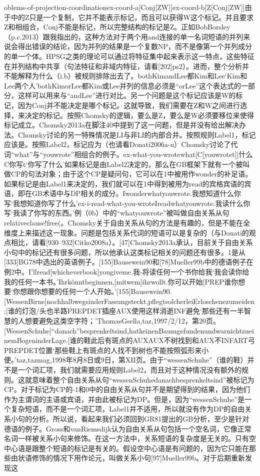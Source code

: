 oblems-of-projection-coordinationex-coord-a[Conj[ZW]]ex-coord-b[Z[Conj[ZW]]由于中的Z只是一个复制，它并不能表示标记，而且可以获得W这个标记。并且要求Z和相组合，Conj不能是标记，所以完整结构的标记是Z。正如BobBorsley（p.c.2013）跟我指出的，这种方法对于两个用and连接的单一名词短语的并列来说会得出错误的结论，因为并列的结果是一个复数NP，而不是像第一个并列成分的单一个体。HPSG之类的理论可以通过将特征集中起来表示这一特点，这些特征在并列结构中共享（句法特征和非域内特征，请看[202]ps2）。进而，整个分析并不能解释为什么（i.b）被规则排除出去了。bothKimandLee都Kim和Lee`Kim和Lee两个人'bothKimorLee都Kim或Lee并列的信息必须是“orLee”这个表达式的一部分，这样可以用来与“andLee”进行对比。另一个问题是这个标记应该是W的标记，因为Conj并不能决定是哪个标记。这就导致，我们需要在Z和W之间进行选择，来决定的标记。按照Chomsky的逻辑，要么是Z，要么是W必须要移位来使得标记成立。Chomsky2013a在脚注40中提到了这一问题，但是并没有给出解决办法。Chomsky讨论的另一特殊情况是LI与非LI的内部合并。按照规则Label1，标记应该是。按照Label2，标记应为（也请看Donati2006a-u）Chomsky讨论了代词“what”与“youwrote”相组合的例子。ex-what-you-wrotewhat[C[youwrotet]]什么C你写t`你写了什么'如果标记是由Label2决定的，那么在GB框架下就有一个被叫做CP的句法对象；由于这个CP是疑问句，它可以在1中被用作wonder的补足语。如果标记是由Label1来决定的，我们就可以在1中得到被用为read的宾格宾语的宾语，即在GB术语中与DP相关的成分。Iwonderwhatyouwrote.我想知道什么你写`我想知道你写了什么'ex-i-read-what-you-wroteIreadwhatyouwrote.我读什么你写`我读了你写的东西。'例（0b）中的“whatyouwrote”被叫做自由关系从句relativeclause!free(。Chomsky关于自由关系从句的方法是有趣的，但是不能在全维度上来描述这一现象。问题是包括关系代词的短语可以是复杂的（与Donati的观点相比，请看[930--932]Citko2008a）。[47]Chomsky2013a承认，目前关于自由关系小句中的标记还有很多问题，所以他承认这类标记相关的问题还有很多。1是从[333]BG78中选出的英语例子。[155]Bausewein90和[78]Mueller99b中的德语例子在例2中。I'llread[whicheverbook]yougiveme.我-将读任何一个书你给我`我会读你给我的任何一本书。'Ihrkönntbeginnen,[mitwem]ihrwollt.你可以开始[PREP谁你想要`你想跟你想要的任何一个人开始。'[155]Bausewein90.[WessenBirne]nochhalbwegsinderFassungsteckt,pflegtsolcherleiErloschenezumeiden;[谁的灯泡/头也半路PREPDET插座AUX使用这样消逝INF避免`那些还有一半智慧的人想要避免这类空字符；'ThomasGsella,taz,1997/2/12，第20页。[WessenSchuhe]"`danach"'besprenkeltsind,hatkeinenBaumgefundenundwarnichtzueinemBogeninderLage.[谁的鞋此后有斑点的AUXAUX不树找到和AUX不INFART弓PREPDET位置`那些鞋上有斑点的人找不到树也不能按照弧形来小便。'taz,tazmag,1998年8月8日或9日，第XII页。由于“wessenSchuhe”（谁的鞋）并不是一个词汇项，我们就需要应用规则Label2，而且对于这种情况没有额外的规则。这就意味着整个自由关系从句“wessenSchuhedanachbesprenkeltsind”被标记为CP。对于标记为CP的-1和0中的自由关系从句并不是期望得到的结果，因为他们作为主谓词的主语或宾语，并由此被标记为DP。但是，因为“wessenSchuhe”是一个复杂短语，而不是一个词汇项，Label1并不适用，所以就没有作为DP的自由关系小句的分析。所以说，看起来我们必须回到GR81提出的GB分析，至少是针对德语的例子。Gross和vanRiemsdijk认为自由关系从句包括一个空名词，它像正常名词一样被关系小句来修饰。在这一方法中，关系短语的复杂度是无关的。只有空中心语是跟整个短语的标记是有关的。假设空中心语是有问题的，因为它只能在那些由状语修饰的情况下用作论元，叫做关系小句[97]Mueller99b。对于后期重新发现这